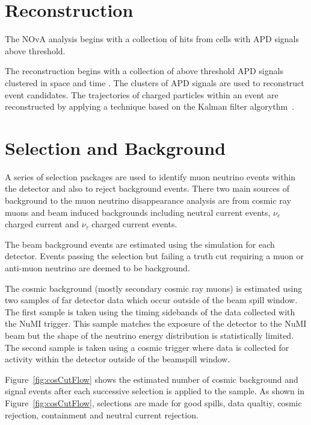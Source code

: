 


\section{Reconstruction}\label{sec:reco}

The NOvA analysis begins with a collection of hits from cells with APD 
signals above threshold. 

The reconstruction begins with a collection of above threshold APD
signals clustered in space and time \cite{baird2015analysis,
  ester1996density}. 
The clusters of APD signals are used to reconstruct event
candidates.
The trajectories of charged particles within an event are reconstructed
by applying a technique based on the Kalman filter
algorythm~\cite{kalman1960new}. 



\section{Selection and Background}\label{sec:sel}

A series of selection packages are used to identify muon neutrino
events within the detector and also to reject background events.  
There two main sources of background to the muon neutrino
disappearance analysis are from cosmic ray muons and beam induced
backgrounds including neutral current events, $\nu_e$ charged current
and $\nu_\tau$ charged current events. 

The beam background events are estimated using the simulation for each
detector.
Events passing the selection but failing a truth cut
requiring a muon or anti-muon neutrino are deemed to be
background. 

The cosmic background (mostly secondary cosmic ray muons) is estimated
using two samples of far detector data which occur outside of the beam
spill window.  
The first sample is taken using the timing sidebands of the data
collected with the NuMI trigger. This sample matches the exposure of the
detector to the NuMI beam but the shape of the neutrino energy
distribution is statistically limited.
The second sample is taken using a cosmic trigger where data is
collected for activity within the detector outside of the beamspill window.

Figure~\ref{fig:cosCutFlow} shows the estimated number of cosmic
background and signal events after each successive selection is
applied to the sample.
As shown in Figure~\ref{fig:cosCutFlow}, selections are made for good
spills, data qualtiy, cosmic rejection, containment and neutral
current rejection. 


